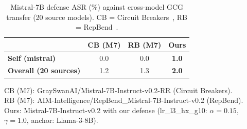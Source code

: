 \begin{table}[ht]
\centering
\caption{Mistral-7B defense ASR (\%) against cross-model GCG transfer (20 source models). CB = Circuit Breakers~\citep{zou2024circuitbreakers}, RB = RepBend~\citep{repbend}.}
\label{tab:baselines}
\setlength{\tabcolsep}{10pt}
\renewcommand{\arraystretch}{1.3}
\begin{tabular}{lccc}
\toprule
 & CB (M7) & RB (M7) & \textbf{Ours} \\
\midrule
\textbf{Self (mistral)}  & 0.0 & 0.0 & \textbf{1.0} \\
\textbf{Overall (20 sources)}  & 1.2 & 1.3 & \textbf{2.0} \\
\bottomrule
\end{tabular}
\setlength{\tabcolsep}{6pt}
\renewcommand{\arraystretch}{1.0}
\vspace{4pt}
\parbox{\linewidth}{\small
CB (M7): GraySwanAI/Mistral-7B-Instruct-v0.2-RR (Circuit Breakers).\\
RB (M7): AIM-Intelligence/RepBend\_Mistral-7B-Instruct-v0.2 (RepBend).\\
Ours: Mistral-7B-Instruct-v0.2 with our defense (lr\_l3\_hx\_g10: $\alpha\!=\!0.15$, $\gamma\!=\!1.0$, anchor: Llama-3-8B).}
\end{table}
